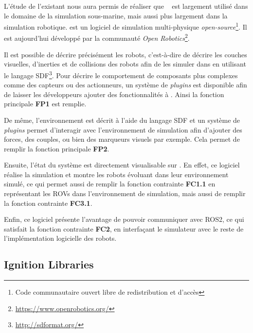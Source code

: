             L'étude de l'existant nous aura permis de réaliser que \gazebo{}~\cite{Koenig-gazebo} est largement utilisé dans le domaine de la simulation sous-marine, mais aussi plus largement dans la simulation robotique. \gazebo{} est un logiciel de simulation multi-physique \textit{open-source}\footnote{Code communautaire ouvert libre de redistribution et d'accès}. Il est aujourd'hui développé par la communauté \textit{Open Robotics}\footnote{\url{https://www.openrobotics.org/}}.
            
            Il est possible de décrire précisément les robots, c'est-à-dire de décrire les couches visuelles, d'inerties et de collisions des robots afin de les simuler dans \gazebo{} en utilisant le langage \gls{SDF}\footnote{\url{http://sdformat.org/}}. Pour décrire le comportement de composants plus complexes comme des capteurs ou des actionneurs, un système de \textit{plugins} est disponible afin de laisser les développeurs ajouter des fonctionnalités à \gazebo{}. Ainsi la fonction principale \textbf{FP1} est remplie.

            De même, l'environnement est décrit à l'aide du langage \gls{SDF} et un système de \textit{plugins} permet d'interagir avec l'environnement de simulation afin d'ajouter des forces, des couples, ou bien des marqueurs visuels par exemple. Cela permet de remplir la fonction principale \textbf{FP2}.

            Ensuite, l'état du système est directement visualisable sur \gazebo{}. En effet, ce logiciel réalise la simulation et montre les robots évoluant dans leur environnement simulé, ce qui permet aussi de remplir la fonction contrainte \textbf{FC1.1} en représentant les \gls{ROV}s dans l'environnement de simulation, mais aussi de remplir la fonction contrainte \textbf{FC3.1}.

            Enfin, ce logiciel présente l'avantage de pouvoir communiquer avec \gls{ROS2}, ce qui satisfait la fonction contrainte \textbf{FC2}, en interfaçant le simulateur avec le reste de l'implémentation logicielle des robots.

        \subsection{Ignition Libraries}

